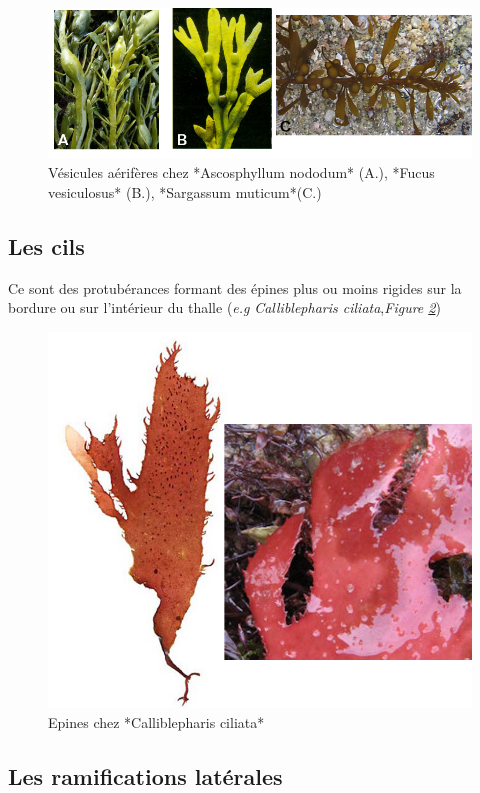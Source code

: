 \documentclass[
]{book}
\begin{document}
\begin{figure}[H]

{\centering \includegraphics[width=0.7\linewidth]{./images/aerocystes} 

}

\caption{Vésicules aérifères chez *Ascosphyllum nododum* (A.), *Fucus vesiculosus* (B.), *Sargassum muticum*(C.)}\label{fig:aero}
\end{figure}

\hypertarget{les-cils}{%
\subsection{Les cils}\label{les-cils}}

Ce sont des protubérances formant des épines plus ou moins rigides sur la bordure ou sur l'intérieur du thalle (\emph{e.g} \emph{Calliblepharis ciliata},\emph{Figure \ref{fig:calliblepharis}})

\begin{figure}[H]

{\centering \includegraphics[width=0.7\linewidth]{./images/calliblepharis} 

}

\caption{Epines chez *Calliblepharis ciliata*}\label{fig:calliblepharis}
\end{figure}

\hypertarget{les-ramifications-latuxe9rales}{%
\subsection{Les ramifications latérales}\label{les-ramifications-latuxe9rales}}
\end{document}
